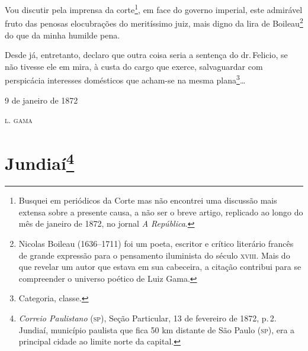 Vou discutir pela imprensa da corte\footnote{ Busquei em periódicos da
  Corte mas não encontrei uma discussão mais extensa sobre a presente
  causa, a não ser o breve artigo, replicado ao longo do mês de janeiro
  de 1872, no jornal \emph{A República}.}, em face do governo imperial,
este admirável fruto das penosas elocubrações do meritíssimo juiz, mais
digno da lira de Boileau\footnote{Nicolas Boileau (1636--1711) foi um
  poeta, escritor e crítico literário francês de grande expressão para o
  pensamento iluminista do século \textsc{xviii}. Mais do que revelar um autor
  que estava em sua cabeceira, a citação contribui para se compreender o
  universo poético de Luiz Gama.} do que da minha humilde pena.

Desde já, entretanto, declaro que outra coisa seria a sentença do dr.\,Felicio, se não tivesse ele em mira, à custa do cargo que exerce,
salvaguardar com perspicácia interesses domésticos que acham-se na mesma
plana\footnote{ Categoria, classe.}\ldots{}

\begin{flushright}
9 de janeiro de 1872

\textsc{l. gama}
\end{flushright}

\chapter{Jundiaí\footnote{\emph{Correio Paulistano} (\textsc{sp}), Seção Particular,
  13 de fevereiro de 1872, p.\,2. Jundiaí, município paulista que fica 50 km distante
  de São Paulo (\textsc{sp}), era a principal cidade ao limite norte da capital.} }%

